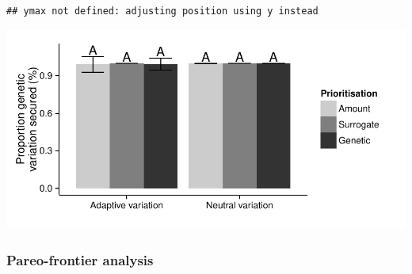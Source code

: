 \documentclass[11pt,]{article}
\let\origfigure\figure
\let\endorigfigure\endfigure
\renewenvironment{figure}[1][2] {
	\expandafter\origfigure\expandafter[H]
} {
	\endorigfigure
}
\begin{document}
\begin{verbatim}
## ymax not defined: adjusting position using y instead
\end{verbatim}

\begin{figure}[htbp]
\centering
\includegraphics{article_files/figure-latex/unnamed-chunk-4-1.pdf}
\caption{Summary of multi-species prioritisations. Three prioritisations
were generated using amount-based targets, amount-based and
surrogate-based targets, and amount-based and genetic-based targets for
each species. Data shows the performance of these prioritisations based
on how much genetic variation they explain. Bars denote means and
standard errors.}
\end{figure}

\subsubsection{Pareo-frontier analysis}\label{pareo-frontier-analysis}
\end{document}
